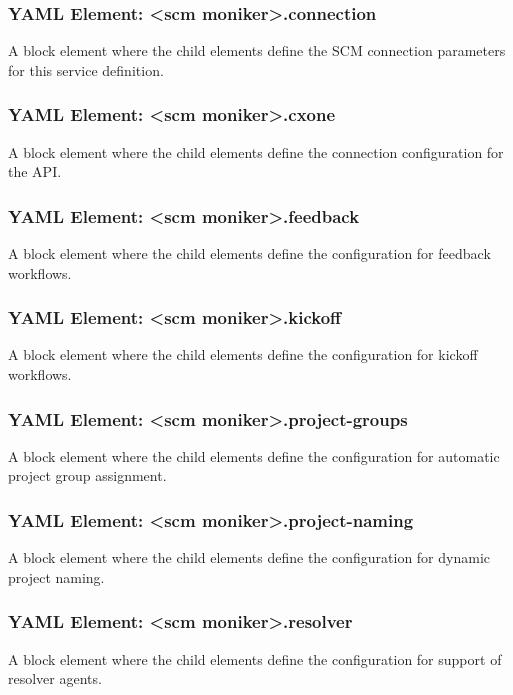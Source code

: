 \subsubsection{YAML Element: <scm moniker>.connection}\label{sec:yaml-moniker-connection}
A block element where the child elements define the SCM connection parameters for this service definition.

\subsubsection{YAML Element: <scm moniker>.cxone}\label{sec:yaml-moniker-cxone}
A block element where the child elements define the connection configuration for the \cxone API. 

\subsubsection{YAML Element: <scm moniker>.feedback}\label{sec:yaml-moniker-feedback}
A block element where the child elements define the configuration for feedback workflows. 

\subsubsection{YAML Element: <scm moniker>.kickoff}\label{sec:yaml-moniker-kickoff}
A block element where the child elements define the configuration for kickoff workflows. 

\subsubsection{YAML Element: <scm moniker>.project-groups}\label{sec:yaml-moniker-project-groups}
A block element where the child elements define the configuration for automatic project group assignment. 

\subsubsection{YAML Element: <scm moniker>.project-naming}\label{sec:yaml-moniker-project-naming}
A block element where the child elements define the configuration for dynamic project naming. 

\subsubsection{YAML Element: <scm moniker>.resolver}\label{sec:yaml-moniker-resolver}
A block element where the child elements define the configuration for support of resolver agents. 

